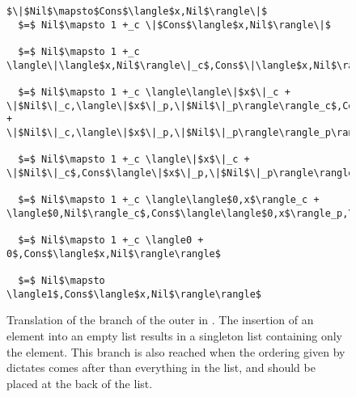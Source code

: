 \begin{figure}[H]
\caption{Translation of the  branch of the outer  in .
The insertion of an element into an empty list results in a singleton list containing only the element.
This branch is also reached when the ordering given by  dictates  comes after than everything in the list,
  and should be placed at the back of the list.
}
\label{fig:insert_nil}
\begin{lstlisting}
$\|$Nil$\mapsto$Cons$\langle$x,Nil$\rangle\|$
  $=$ Nil$\mapsto 1 +_c \|$Cons$\langle$x,Nil$\rangle\|$

  $=$ Nil$\mapsto 1 +_c \langle\|\langle$x,Nil$\rangle\|_c$,Cons$\|\langle$x,Nil$\rangle\|_p\rangle$

  $=$ Nil$\mapsto 1 +_c \langle\langle\|$x$\|_c + \|$Nil$\|_c,\langle\|$x$\|_p,\|$Nil$\|_p\rangle\rangle_c$,Cons$\langle\|$x$\|_c + \|$Nil$\|_c,\langle\|$x$\|_p,\|$Nil$\|_p\rangle\rangle_p\rangle$

  $=$ Nil$\mapsto 1 +_c \langle\|$x$\|_c + \|$Nil$\|_c$,Cons$\langle\|$x$\|_p,\|$Nil$\|_p\rangle\rangle$

  $=$ Nil$\mapsto 1 +_c \langle\langle$0,x$\rangle_c + \langle$0,Nil$\rangle_c$,Cons$\langle\langle$0,x$\rangle_p,\langle$0,Nil$\rangle_p\rangle\rangle$

  $=$ Nil$\mapsto 1 +_c \langle0 + 0$,Cons$\langle$x,Nil$\rangle\rangle$

  $=$ Nil$\mapsto \langle1$,Cons$\langle$x,Nil$\rangle\rangle$
\end{lstlisting}
\end{figure}

